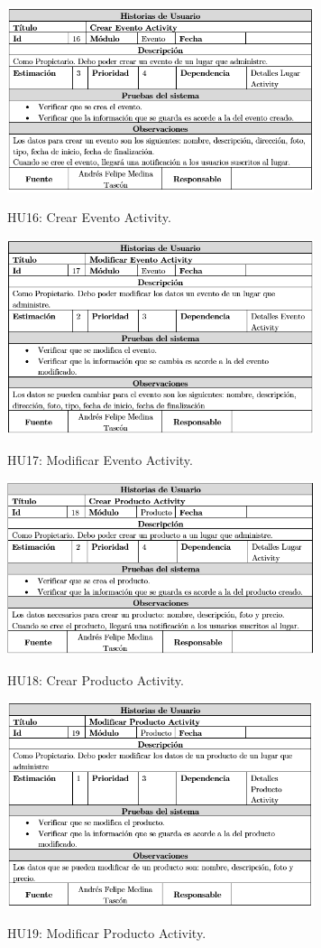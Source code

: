 \documentclass[12pt,letterpaper,openany]{book}
\begin{document}
\begin{table}[H]
\centering
\includegraphics[width=9cm]{./imagenes/HU/HU16}
\caption{HU16: Crear Evento Activity.}
\end{table}

\begin{table}[H]
\centering
\includegraphics[width=9cm]{./imagenes/HU/HU17}
\caption{HU17: Modificar Evento Activity.}
\end{table}

\begin{table}[H]
\centering
\includegraphics[width=9cm]{./imagenes/HU/HU18}
\caption{HU18: Crear Producto Activity.}
\end{table}

\begin{table}[H]
\centering
\includegraphics[width=9cm]{./imagenes/HU/HU19}
\caption{HU19: Modificar Producto Activity.}
\end{table}
\end{document}
